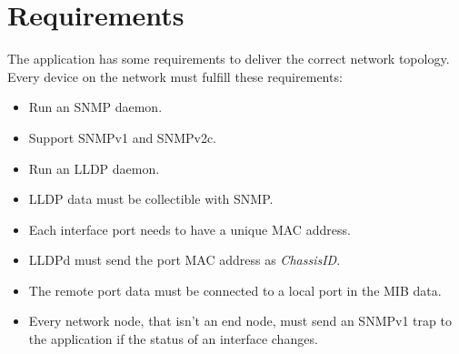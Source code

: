 \section{Requirements}
\label{Section:Evaluation-Requirements}

The application has some requirements to deliver the correct network topology. Every device on the network must fulfill these requirements:

\begin{minipage}{\textwidth}
\begin{itemize}
    \item Run an SNMP daemon.
    \item Support SNMPv1 and SNMPv2c.
    \item Run an LLDP daemon.
    \item LLDP data must be collectible with SNMP.
    \item Each interface port needs to have a unique MAC address.
    \item LLDPd must send the port MAC address as \textit{ChassisID}.
    \item The remote port data must be connected to a local port in the MIB data.
    \item Every network node, that isn't an end node, must send an SNMPv1 trap to the application if the status of an interface changes.
\end{itemize}
\end{minipage}